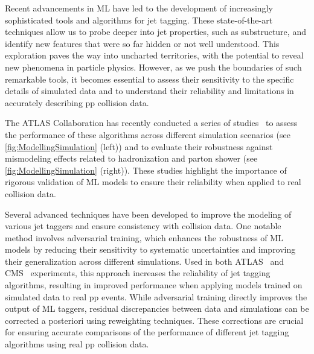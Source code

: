 \documentclass[a4paper,11pt]{article}
\begin{document}
Recent advancements in ML have led to the development of increasingly sophisticated tools and algorithms for jet tagging.
These state-of-the-art techniques allow us to probe deeper into jet properties, such as substructure,
and identify new features that were so far hidden or not well understood.
This exploration paves the way into uncharted territories, with the potential to reveal new phenomena in particle physics.
However, as we push the boundaries of such remarkable tools, it becomes essential to assess
their sensitivity to the specific details of simulated data and to understand their reliability and limitations
in accurately describing pp collision data.

The ATLAS Collaboration has recently conducted a series of studies~\cite{ATL-PHYS-PUB-2023-017,ATL-PHYS-PUB-2023-020} 
to assess the performance of these algorithms across different simulation scenarios (see \cref{fig:ModellingSimulation} (left))
and to evaluate their robustness against mismodeling effects related to hadronization and parton shower (see \cref{fig:ModellingSimulation} (right)).
These studies highlight the importance of rigorous validation of ML models
to ensure their reliability when applied to real collision data.


Several advanced techniques have been developed to improve the modeling of various jet taggers
and ensure consistency with collision data.
One notable method involves adversarial training, which enhances the robustness of ML models by reducing
their sensitivity to systematic uncertainties and improving their generalization across different simulations.
Used in both ATLAS~\cite{ATL-PHYS-PUB-2023-020} and CMS~\cite{CMS-DP-2022-049} experiments, this approach increases the reliability of jet tagging algorithms,
resulting in improved performance when applying models trained on simulated data to real pp events.
While adversarial training directly improves the output of ML taggers, residual discrepancies between data and simulations
can be corrected a posteriori using reweighting techniques. These corrections are crucial for ensuring accurate comparisons
of the performance of different jet tagging algorithms using real pp collision data.
\end{document}
